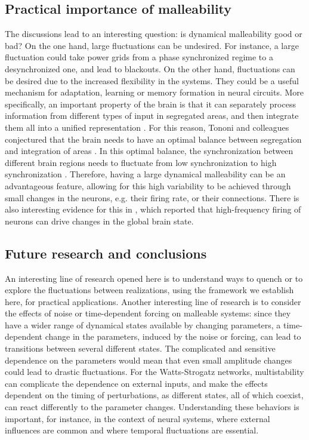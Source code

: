 \subsection{Practical importance of malleability}
The discussions lead to an interesting question: is dynamical malleability good or bad?  On the one hand, large fluctuations can be undesired. For instance, a large fluctuation could take power grids from a phase synchronized regime to a desynchronized one, and lead to blackouts. On the other hand, fluctuations can be desired due to the increased flexibility in the systems. They could be a useful mechanism for adaptation, learning or memory formation in neural circuits. More specifically, an important property of the brain is that it can separately process information from different types of input in segregated areas, and then integrate them all into a unified representation \cite{tononi1994a, tononi1998consciousness, deco2015rethinking}. For this reason, Tononi and colleagues conjectured that the brain needs to have an optimal balance between segregation and integration of areas \cite{tononi1994a}. In this optimal balance, the synchronization between different brain regions needs to fluctuate from low synchronization to high synchronization \cite{fingelkurts2006timing}. Therefore, having a large dynamical malleability can be an advantageous feature, allowing for this high variability to be achieved through small changes in the neurons, e.g. their firing rate, or their connections. There is also interesting evidence for this in \cite{li2009burst}, which reported that high-frequency firing of neurons can drive changes in the global brain state. 

\subsection{Future research and conclusions}
An interesting line of research opened here is to understand ways to quench or to explore the fluctuations between realizations, using the framework we establish here, for practical applications. Another interesting line of research is to consider the effects of noise or time-dependent forcing on malleable systems: since they have a wider range of dynamical states available by changing parameters, a time-dependent change in the parameters, induced by the noise or forcing, can lead to transitions between several different states. The complicated and sensitive dependence on the parameters would mean that even small amplitude changes could lead to drastic fluctuations. 
For the Watts-Strogatz networks, multistability can complicate the dependence on external inputs, and make the effects dependent on the timing of perturbations, as different states, all of which coexist, can react differently to the parameter changes. Understanding these behaviors is important, for instance, in the context of neural systems, where external influences are common and where temporal fluctuations are essential.

